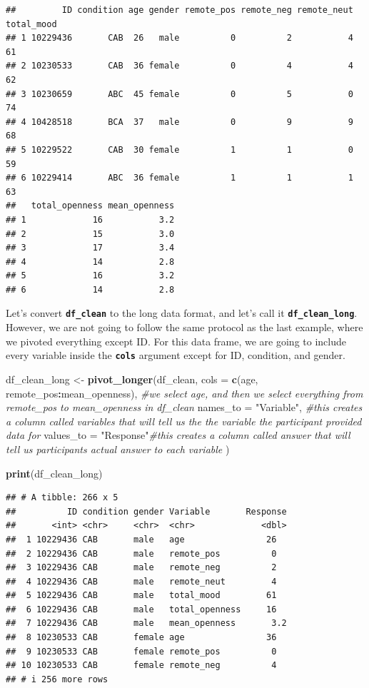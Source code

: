 \documentclass[
]{book}
\newenvironment{Shaded}{\begin{snugshade}}{\end{snugshade}}
\newcommand{\AttributeTok}[1]{\textcolor[rgb]{0.13,0.29,0.53}{#1}}
\newcommand{\CommentTok}[1]{\textcolor[rgb]{0.56,0.35,0.01}{\textit{#1}}}
\newcommand{\FunctionTok}[1]{\textcolor[rgb]{0.13,0.29,0.53}{\textbf{#1}}}
\newcommand{\NormalTok}[1]{#1}
\newcommand{\OtherTok}[1]{\textcolor[rgb]{0.56,0.35,0.01}{#1}}
\newcommand{\SpecialCharTok}[1]{\textcolor[rgb]{0.81,0.36,0.00}{\textbf{#1}}}
\newcommand{\StringTok}[1]{\textcolor[rgb]{0.31,0.60,0.02}{#1}}
\begin{document}
\begin{verbatim}
##         ID condition age gender remote_pos remote_neg remote_neut total_mood
## 1 10229436       CAB  26   male          0          2           4         61
## 2 10230533       CAB  36 female          0          4           4         62
## 3 10230659       ABC  45 female          0          5           0         74
## 4 10428518       BCA  37   male          0          9           9         68
## 5 10229522       CAB  30 female          1          1           0         59
## 6 10229414       ABC  36 female          1          1           1         63
##   total_openness mean_openness
## 1             16           3.2
## 2             15           3.0
## 3             17           3.4
## 4             14           2.8
## 5             16           3.2
## 6             14           2.8
\end{verbatim}

Let's convert \textbf{\texttt{df\_clean}} to the long data format, and let's call it \textbf{\texttt{df\_clean\_long}}. However, we are not going to follow the same protocol as the last example, where we pivoted everything except ID. For this data frame, we are going to include every variable inside the \textbf{\texttt{cols}} argument except for ID, condition, and gender.

\begin{Shaded}
\begin{Highlighting}[]
\NormalTok{df\_clean\_long }\OtherTok{\textless{}{-}} \FunctionTok{pivot\_longer}\NormalTok{(df\_clean,}
  \AttributeTok{cols =} \FunctionTok{c}\NormalTok{(age, remote\_pos}\SpecialCharTok{:}\NormalTok{mean\_openness), }\CommentTok{\#we select age, and then we select everything from remote\_pos to mean\_openness in df\_clean}
  \AttributeTok{names\_to =} \StringTok{"Variable"}\NormalTok{, }\CommentTok{\#this creates a column called \textasciigrave{}variables\textasciigrave{} that will tell us the the variable the participant provided data for}
  \AttributeTok{values\_to =} \StringTok{"Response"}\CommentTok{\#this creates a column called \textasciigrave{}answer\textasciigrave{} that will tell us participants actual answer to each variable}
\NormalTok{)}


\FunctionTok{print}\NormalTok{(df\_clean\_long)}
\end{Highlighting}
\end{Shaded}

\begin{verbatim}
## # A tibble: 266 x 5
##          ID condition gender Variable       Response
##       <int> <chr>     <chr>  <chr>             <dbl>
##  1 10229436 CAB       male   age                26  
##  2 10229436 CAB       male   remote_pos          0  
##  3 10229436 CAB       male   remote_neg          2  
##  4 10229436 CAB       male   remote_neut         4  
##  5 10229436 CAB       male   total_mood         61  
##  6 10229436 CAB       male   total_openness     16  
##  7 10229436 CAB       male   mean_openness       3.2
##  8 10230533 CAB       female age                36  
##  9 10230533 CAB       female remote_pos          0  
## 10 10230533 CAB       female remote_neg          4  
## # i 256 more rows
\end{verbatim}
\end{document}
